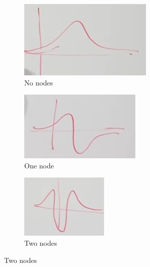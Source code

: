 \documentclass[]{article}
\begin{document}
\begin{figure}[H]
	\caption{Solving Central Potential Schro\"dinger Equation (\ref{eq:schroedinger:central})}
	\begin{subfigure}[t]{0.30\textwidth}
		\caption{No nodes}\label{fig:aqm-3-central-0node}
		\includegraphics[width=\textwidth]{aqm-3-central-0node}
	\end{subfigure}
	\quad
	\begin{subfigure}[t]{0.30\textwidth}
		\caption{One node}\label{fig:aqm-3-central-1node}
		\includegraphics[width=\textwidth]{aqm-3-central-1node}
	\end{subfigure}
	\quad
	\begin{subfigure}[t]{0.30\textwidth}
		\caption{Two nodes}\label{fig:aqm-3-central-2nodes}
		\includegraphics[width=\textwidth]{aqm-3-central-2node2}
	\end{subfigure}
\end{figure}
\end{document}

